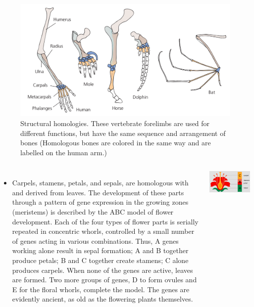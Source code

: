 \documentclass[11pt,dvipsnames,ignorenonframetext,aspectratio=169]{beamer}
\begin{document}
\begin{frame}{}
\protect\hypertarget{section-1}{}
\begin{figure}
\includegraphics[width=0.86\linewidth]{../images/structural_homologies_bones_human_other} \caption{Structural homologies. These vertebrate forelimbs are used for different functions, but have the same sequence and arrangement of bones (Homologous bones are colored in the same way and are labelled on the human arm.)}\label{fig:structural-homologies-bones}
\end{figure}
\end{frame}

\begin{frame}{}
\protect\hypertarget{section-2}{}
\begin{columns}
\begin{itemize}
\footnotesize
\item Carpels, stamens, petals, and sepals, are homologous with and derived from leaves. The development of these parts through a pattern of gene expression in the growing zones (meristems) is described by the ABC model of flower development. Each of the four types of flower parts is serially repeated in concentric whorls, controlled by a small number of genes acting in various combinations. Thus, A genes working alone result in sepal formation; A and B together produce petals; B and C together create stamens; C alone produces carpels. When none of the genes are active, leaves are formed. Two more groups of genes, D to form ovules and E for the floral whorls, complete the model. The genes are evidently ancient, as old as the flowering plants themselves.
\end{itemize}


\includegraphics[width=0.98\linewidth]{../images/floral-parts-as-leaf-homologues} 

\end{columns}
\end{frame}
\end{document}
